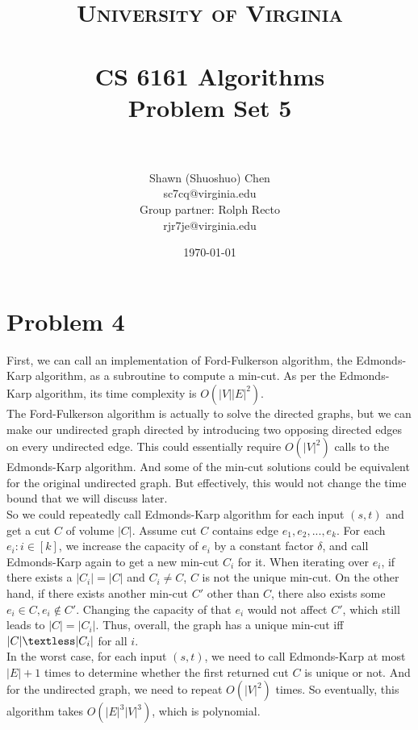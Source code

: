 \documentclass[titlepage, paper=a4, fontsize=11pt]{scrartcl} %
\title{	
\normalfont \normalsize 
\textsc{University of Virginia} \\ [25pt] %
\horrule{0.5pt} \\[0.4cm] %
\huge CS 6161 Algorithms \\
\huge Problem Set 5 \\ %
\horrule{2pt} \\[0.5cm] %
}
\author{Shawn (Shuoshuo) Chen\\sc7cq@virginia.edu\\Group partner: Rolph Recto\\ rjr7je@virginia.edu} %
\date{\normalsize\today} %
\numberwithin{equation}{section} %
\numberwithin{figure}{section} %
\numberwithin{table}{section} %
\begin{document}
\maketitle %


\section*{Problem 4}
First, we can call an implementation of Ford-Fulkerson algorithm, the Edmonds-Karp algorithm, as a subroutine to compute a min-cut. As per the Edmonds-Karp algorithm, its time complexity is $O(|V||E|^2)$. \\

The Ford-Fulkerson algorithm is actually to solve the directed graphs, but we can make our undirected graph directed by introducing two opposing directed edges on every undirected edge. This could essentially require $O(|V|^2)$ calls to the Edmonds-Karp algorithm. And some of the min-cut solutions could be equivalent for the original undirected graph. But effectively, this would not change the time bound that we will discuss later. \\

So we could repeatedly call Edmonds-Karp algorithm for each input $(s, t)$ and get a cut $C$ of volume $|C|$. Assume cut $C$ contains edge $e_1, e_2, ... , e_k$. For each $e_i: i \in [k]$, we increase the capacity of $e_i$ by a constant factor $\delta$, and call Edmonds-Karp again to get a new min-cut $C_i$ for it. When iterating over $e_i$, if there exists a $|C_i|=|C|$ and $C_i \neq C$, $C$ is not the unique min-cut. On the other hand, if there exists another min-cut $C'$ other than $C$, there also exists some $e_i \in C, e_i \notin C'$. Changing the capacity of that $e_i$ would not affect $C'$, which still leads to $|C|=|C_i|$. Thus, overall, the graph has a unique min-cut iff $|C| \textless |C_i|$ for all $i$. \\

In the worst case, for each input $(s, t)$, we need to call Edmonds-Karp at most $|E|+1$ times to determine whether the first returned cut $C$ is unique or not. And for the undirected graph, we need to repeat $O(|V|^2)$ times. So eventually, this algorithm takes $O(|E|^3|V|^3)$, which is polynomial.
\end{document}

